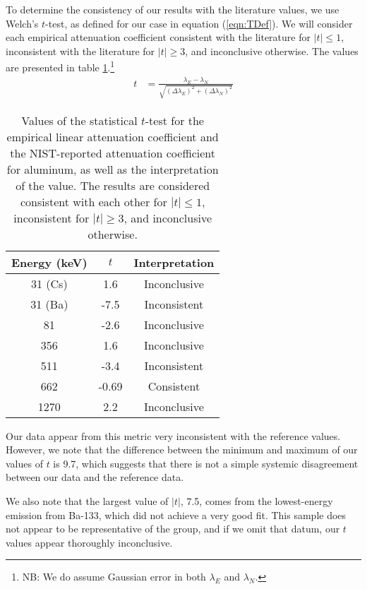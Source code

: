 \documentclass[letter]{article}
\begin{document}
To determine the consistency of our results with the literature values, we use Welch's $t$-test, as defined for our case in equation (\ref{eqn:TDef}). We will consider each empirical attenuation coefficient consistent with the literature for $|t| \leq 1$, inconsistent with the literature for $|t| \geq 3$, and inconclusive otherwise. The values are presented in table \ref{tab:tValues}.\footnote{NB: We do assume Gaussian error in both $\lambda_E$ and $\lambda_N$.}
\begin{align} 
t
&=
\frac{\lambda_E - \lambda_N}{\sqrt{ (\Delta \lambda_E)^2 + (\Delta \lambda_N)^2 }} \label{eqn:TDef}
\end{align}


\begin{table}[h] 
\centering  \begin{tabular}{ c  c   c  } 
Energy (\unit{\kilo\electronvolt}) & $t$ & Interpretation  \\ \hline
31 (Cs) & 1.6 & Inconclusive \\ 
31 (Ba) &  -7.5 & Inconsistent \\
81 &  -2.6 & Inconclusive \\
356 &  1.6 & Inconclusive \\
511 &  -3.4 & Inconsistent \\
662 &  -0.69 & Consistent \\
1270 &  2.2 & Inconclusive 
\end{tabular}
\caption{Values of the statistical $t$-test for the empirical linear attenuation coefficient and the NIST-reported attenuation coefficient for aluminum, as well as the interpretation of the value. The results are considered consistent with each other for $|t| \leq 1$, inconsistent for $|t|\geq3$, and inconclusive otherwise.}
\label{tab:tValues}
\end{table}

Our data appear from this metric very inconsistent with the reference values. However, we note that the difference between the minimum and maximum of our values of $t$ is 9.7, which suggests that there is not a simple systemic disagreement between our data and the reference data.

\newpage
We also note that the largest value of $|t|$, 7.5, comes from the lowest-energy emission from Ba-133, which did not achieve a very good fit. This sample does not appear to be representative of the group, and if we omit that datum, our $t$ values appear thoroughly inconclusive.
\end{document}
